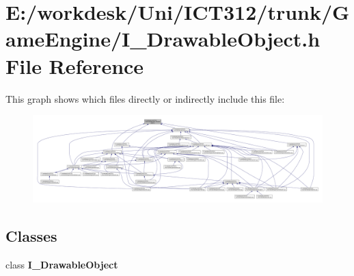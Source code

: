 \section{E\+:/workdesk/\+Uni/\+I\+C\+T312/trunk/\+Game\+Engine/\+I\+\_\+\+Drawable\+Object.h File Reference}
\label{_i___drawable_object_8h}
This graph shows which files directly or indirectly include this file\+:
\nopagebreak
\begin{figure}[H]
\begin{center}
\leavevmode
\includegraphics[width=350pt]{d4/d03/_i___drawable_object_8h__dep__incl}
\end{center}
\end{figure}
\subsection*{Classes}
\begin{DoxyCompactItemize}
\item 
class {\bf I\+\_\+\+Drawable\+Object}
\end{DoxyCompactItemize}

